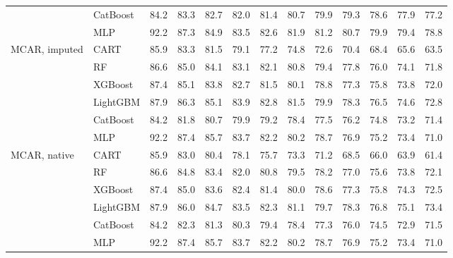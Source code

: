 \documentclass[pdflatex,sn-mathphys]{sn-jnl}
\theoremstyle{thmstyleone}
\begin{document}
\begin{table}[htbp]
\begin{tabular}{@{}llrrrrrrrrrrr@{}}
 & CatBoost & 84.2 & 83.3 & 82.7 & 82.0 & 81.4 & 80.7 & 79.9 & 79.3 & 78.6 & 77.9 & 77.2 \\
 & MLP & 92.2 & 87.3 & 84.9 & 83.5 & 82.6 & 81.9 & 81.2 & 80.7 & 79.9 & 79.4 & 78.8 \\
\midrule
MCAR, imputed & CART & 85.9 & 83.3 & 81.5 & 79.1 & 77.2 & 74.8 & 72.6 & 70.4 & 68.4 & 65.6 & 63.5 \\
 & RF & 86.6 & 85.0 & 84.1 & 83.1 & 82.1 & 80.8 & 79.4 & 77.8 & 76.0 & 74.1 & 71.8 \\
 & XGBoost & 87.4 & 85.1 & 83.8 & 82.7 & 81.5 & 80.1 & 78.8 & 77.3 & 75.8 & 73.8 & 72.0 \\
 & LightGBM & 87.9 & 86.3 & 85.1 & 83.9 & 82.8 & 81.5 & 79.9 & 78.3 & 76.5 & 74.6 & 72.8 \\
 & CatBoost & 84.2 & 81.8 & 80.7 & 79.9 & 79.2 & 78.4 & 77.5 & 76.2 & 74.8 & 73.2 & 71.4 \\
 & MLP & 92.2 & 87.4 & 85.7 & 83.7 & 82.2 & 80.2 & 78.7 & 76.9 & 75.2 & 73.4 & 71.0 \\
\midrule
MCAR, native & CART & 85.9 & 83.0 & 80.4 & 78.1 & 75.7 & 73.3 & 71.2 & 68.5 & 66.0 & 63.9 & 61.4 \\
 & RF & 86.6 & 84.8 & 83.4 & 82.0 & 80.8 & 79.5 & 78.2 & 77.0 & 75.6 & 73.8 & 72.1 \\
 & XGBoost & 87.4 & 85.0 & 83.6 & 82.4 & 81.4 & 80.0 & 78.6 & 77.3 & 75.8 & 74.3 & 72.5 \\
 & LightGBM & 87.9 & 86.0 & 84.7 & 83.5 & 82.3 & 81.1 & 79.7 & 78.3 & 76.8 & 75.1 & 73.4 \\
 & CatBoost & 84.2 & 82.3 & 81.3 & 80.3 & 79.4 & 78.4 & 77.3 & 76.0 & 74.5 & 72.9 & 71.5 \\
 & MLP & 92.2 & 87.4 & 85.7 & 83.7 & 82.2 & 80.2 & 78.7 & 76.9 & 75.2 & 73.4 & 71.0 \\
\bottomrule
\end{tabular}
\end{table}
\end{document}
